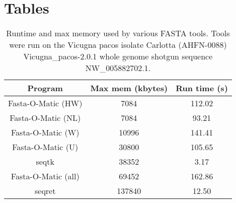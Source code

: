 \section*{Tables}
\begin{table} 
    \begin{tabular}{ c c c }
        Program & Max mem (kbytes) & Run time (s) \\ \hline
        Fasta-O-Matic (HW) & 7084 & 112.02 \\ 
        Fasta-O-Matic (NL) & 7084 & 93.21 \\ 
        Fasta-O-Matic (W) & 10996 & 141.41 \\ 
        Fasta-O-Matic (U) & 30800 & 105.65 \\ 
        seqtk & 38352 & 3.17 \\ 
        Fasta-O-Matic (all) & 69452 & 162.86 \\ 
        seqret & 137840 & 12.50 \\
    \end{tabular} 
    \caption{Runtime and max memory used by various FASTA tools. Tools were run on the Vicugna pacos isolate Carlotta (AHFN-0088) Vicugna_pacos-2.0.1 whole genome shotgun sequence NW_005882702.1.} 
\end{table}

  
  
  
  
  
  
  
  
  
  
  